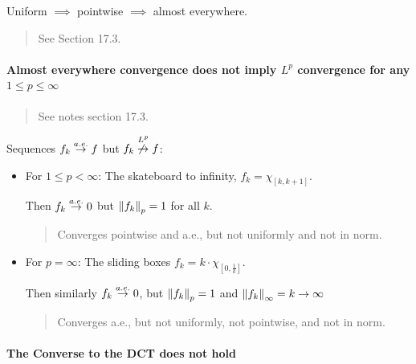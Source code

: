 Uniform \(\implies\) pointwise \(\implies\) almost everywhere.

\begin{quote}
See Section 17.3.
\end{quote}

\hypertarget{almost-everywhere-convergence-does-not-imply-lp-convergence-for-any-1leq-p-leq-infty}{%
\paragraph{\texorpdfstring{Almost everywhere convergence does not imply
\(L^p\) convergence for any
\(1\leq p \leq \infty\)}{Almost everywhere convergence does not imply L\^{}p convergence for any 1\textbackslash leq p \textbackslash leq \textbackslash infty}}\label{almost-everywhere-convergence-does-not-imply-lp-convergence-for-any-1leq-p-leq-infty}}

\begin{quote}
See notes section 17.3.
\end{quote}

Sequences \(f_k \overset{a.e.}\to f\) but
\(f_k \overset{L^p}{\not\to} f\):

\begin{itemize}
\item
  For \(1\leq p < \infty\): The skateboard to infinity,
  \(f_k = \chi_{[k, k+1]}\).

  Then \(f_k \overset{a.e.}\to 0\) but \({\left\lVert {f_k} \right\rVert}_p = 1\) for all
  \(k\).

  \begin{quote}
  Converges pointwise and a.e., but not uniformly and not in norm.
  \end{quote}
\item
  For \(p = \infty\): The sliding boxes
  \(f_k = k \cdot \chi_{[0, \frac 1 k]}\).

  Then similarly \(f_k \overset{a.e.}\to 0\), but \({\left\lVert {f_k} \right\rVert}_p = 1\)
  and \({\left\lVert {f_k} \right\rVert}_\infty = k \to \infty\)

  \begin{quote}
  Converges a.e., but not uniformly, not pointwise, and not in norm.
  \end{quote}
\end{itemize}

\hypertarget{the-converse-to-the-dct-does-not-hold}{%
\paragraph{The Converse to the DCT does not
hold}\label{the-converse-to-the-dct-does-not-hold}}

